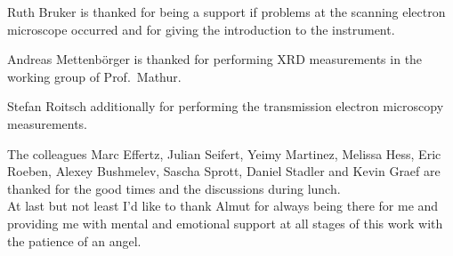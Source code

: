 \documentclass[\main/dresen_thesis.tex]{subfiles}
\begin{document}
	Ruth Bruker is thanked for being a support if problems at the scanning electron microscope occurred and for giving the introduction to the instrument.

	Andreas Mettenb\"orger is thanked for performing XRD measurements in the working group of Prof.\ Mathur.

	Stefan Roitsch additionally for performing the transmission electron microscopy measurements.

	The colleagues Marc Effertz, Julian Seifert, Yeimy Martinez, Melissa Hess, Eric Roeben, Alexey Bushmelev, Sascha Sprott, Daniel Stadler and Kevin Graef are thanked for the good times and the discussions during lunch.
	\\

	At last but not least I'd like to thank Almut for always being there for me and providing me with mental and emotional support at all stages of this work with the patience of an angel.
\end{document}
